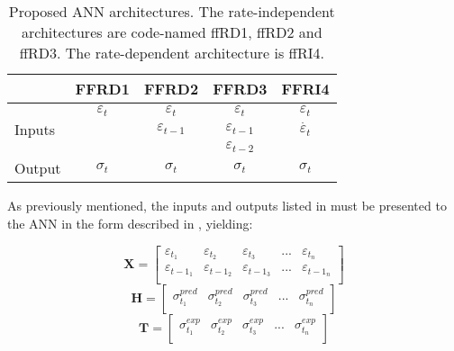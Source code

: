 \begin{table}[htbp!]
    \centering
    \caption{Proposed ANN architectures. The rate-independent architectures are code-named ffRD1, ffRD2 and ffRD3. The rate-dependent architecture is ffRI4.}
    \begin{tabular}{lcccc}
    \toprule
                            & FFRD1               & FFRD2                   & FFRD3                   & FFRI4\\
    \hline
    \multirow{3}{*}{Inputs} & $\varepsilon_t$   & $\varepsilon_t$       & $\varepsilon_t$       & $\varepsilon_t$       \\
                            &                   & $\varepsilon_{t-1}$   & $\varepsilon_{t-1}$   & $\Dot{\varepsilon_t}$ \\
                            &                   &                       & $\varepsilon_{t-2}$   &                       \\
    \hline
    Output                  & $\sigma_t$        & $\sigma_t$            & $\sigma_t$            & $\sigma_t$            \\
    \bottomrule
    \end{tabular}
    \label{tbl:ANNArchitectures}
\end{table}

As previously mentioned, the inputs and outputs listed in  must be presented to the ANN in the form described in , yielding:

\begin{equation}
    \mathbf{X} = 
        \begin{bmatrix}
            \varepsilon_{t_1}  & \varepsilon_{t_2}       & \varepsilon_{t_3}      & ... & \varepsilon_{t_n} \\ 
            \varepsilon_{{t-1}_1}& \varepsilon_{{t-1}_2}  & \varepsilon_{{t-1}_3}  & ... & \varepsilon_{{t-1}_n} \\
        \end{bmatrix}
\end{equation}
\begin{equation}
    \mathbf{H} = 
        \begin{bmatrix}
            \sigma^{pred}_{t_1}  & \sigma^{pred}_{t_2}       & \sigma^{pred}_{t_3}      & ... & \sigma^{pred}_{t_n} \\ 
        \end{bmatrix}
\end{equation}
\begin{equation}
    \mathbf{T} = 
        \begin{bmatrix}
            \sigma^{exp}_{t_1}  & \sigma^{exp}_{t_2}       & \sigma^{exp}_{t_3}      & ... & \sigma^{exp}_{t_n} \\ 
        \end{bmatrix}
\end{equation}


